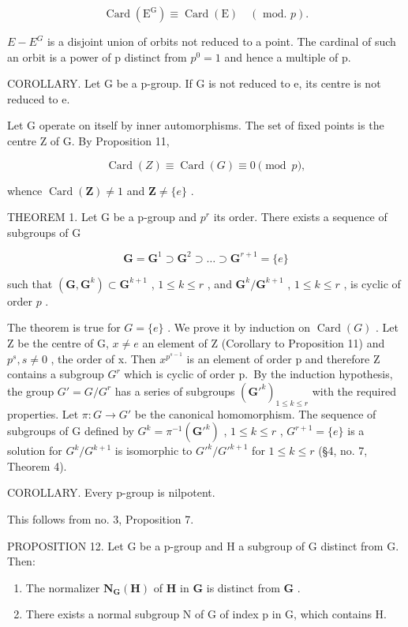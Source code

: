 \[
\operatorname{Card} \left(\mathrm{E} ^ {\mathrm{G}}\right) \equiv \operatorname{Card} (\mathrm{E}) \quad (\text { mod. } p).
\]

\(E - E^{G}\) is a disjoint union of orbits not reduced to a point. The cardinal of such an orbit is a power of p distinct from \(p^{0} = 1\) and hence a multiple of p.

COROLLARY. Let G be a p-group. If G is not reduced to e, its centre is not reduced to e.

Let G operate on itself by inner automorphisms. The set of fixed points is the centre Z of G. By Proposition 11,

\[
\operatorname{Card} (Z) \equiv \operatorname{Card} (G) \equiv 0 \pmod {p},
\]

whence \(\operatorname{Card}(\mathbf{Z}) \neq 1\) and \(\mathbf{Z} \neq \{e\}\) .

THEOREM 1. Let G be a p-group and \(p^{r}\) its order. There exists a sequence of subgroups of G

\[
\mathbf {G} = \mathbf {G} ^ {1} \supset \mathbf {G} ^ {2} \supset \dots \supset \mathbf {G} ^ {r + 1} = \{e \}
\]

such that \((\mathbf{G},\mathbf{G}^k)\subset \mathbf{G}^{k + 1}\) , \(1\leqslant k\leqslant r\) , and \(\mathbf{G}^k /\mathbf{G}^{k + 1}\) , \(1\leqslant k\leqslant r\) , is cyclic of order \(p\) .

The theorem is true for \(G = \{e\}\) . We prove it by induction on \(\operatorname{Card}(G)\) . Let Z be the centre of G, \(x \neq e\) an element of Z (Corollary to Proposition 11) and \(p^{s}, s \neq 0\) , the order of x. Then \(x^{p^{s-1}}\) is an element of order p and therefore Z contains a subgroup \(G^{r}\) which is cyclic of order p.~By the induction hypothesis, the group \(G' = G/G^{r}\) has a series of subgroups \((\mathbf{G}'^{k})_{1 \leqslant k \leqslant r}\) with the required properties. Let \(\pi: G \to G'\) be the canonical homomorphism. The sequence of subgroups of G defined by \(G^{k} = \pi^{-1}(\mathbf{G}'^{k})\) , \(1 \leqslant k \leqslant r\) , \(G^{r+1} = \{e\}\) is a solution for \(G^{k}/G^{k+1}\) is isomorphic to \(G'^{k}/G'^{k+1}\) for \(1 \leqslant k \leqslant r\) (§4, no. 7, Theorem 4).

COROLLARY. Every p-group is nilpotent.

This follows from no. 3, Proposition 7.

PROPOSITION 12. Let G be a p-group and H a subgroup of G distinct from G. Then:

\begin{enumerate}
\def\labelenumi{(\alph{enumi})}
\item
  The normalizer \(\mathbf{N}_{\mathbf{G}}(\mathbf{H})\) of \(\mathbf{H}\) in \(\mathbf{G}\) is distinct from \(\mathbf{G}\) .
\item
  There exists a normal subgroup N of G of index p in G, which contains H.
\end{enumerate}

